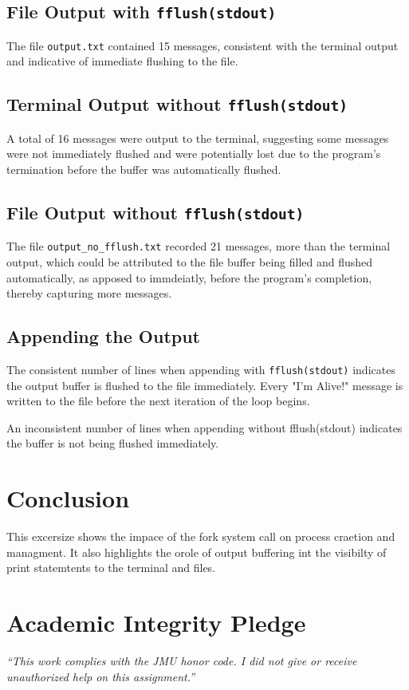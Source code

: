 \documentclass[12pt]{article}
\begin{document}
\subsection{File Output with \texttt{fflush(stdout)}}
The file \texttt{output.txt} contained 15 messages, consistent with the terminal output and indicative of immediate flushing to the file.

\subsection{Terminal Output without \texttt{fflush(stdout)}}
A total of 16 messages were output to the terminal, suggesting some messages were not immediately flushed and were potentially lost due to the program's termination before the buffer was automatically flushed.

\subsection{File Output without \texttt{fflush(stdout)}}
The file \texttt{output\_no\_fflush.txt} recorded 21 messages, more than the terminal output, which could be attributed to the file buffer being filled and flushed automatically, as apposed to immdeiatly, before the program's completion, thereby capturing more messages.

\subsection{Appending the Output}
The consistent number of lines when appending with \texttt{fflush(stdout)} indicates the output buffer is flushed to the file immediately. Every "I'm Alive!" message is written to the file before the next iteration of the loop begins. 

An inconsistent number of lines when appending without fflush(stdout) indicates the buffer is not being flushed immediately. 

\section{Conclusion}
This excersize shows the impace of the fork system call on process craetion and managment. It also highlights the orole of output buffering int the visibilty of print statemtents to the terminal and files. 

\vfill
  \section*{Academic Integrity Pledge}
    {\color{red}\textit{“This work complies with the JMU honor code. I did not give or receive unauthorized help on this assignment.”}}
\end{document}
